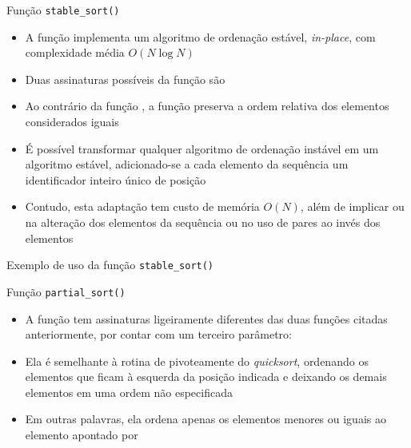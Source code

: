 \begin{frame}[fragile]{Função \texttt{stable\_sort()}}

    \begin{itemize}

        \item A função  implementa um algoritmo de ordenação estável,
            \textit{in-place}, com complexidade média $O(N\log N)$
        
        \item Duas assinaturas possíveis da função  são

        \item Ao contrário da função , a função 
            preserva a ordem relativa dos elementos considerados iguais

        \item É possível transformar qualquer algoritmo de ordenação instável em um algoritmo
            estável, adicionado-se a cada elemento da sequência um identificador inteiro 
            único de posição 

        \item Contudo, esta adaptação tem custo de memória $O(N)$, além de implicar ou na 
            alteração dos elementos da sequência ou no uso de pares ao invés dos elementos
    \end{itemize}

\end{frame}

\begin{frame}[fragile]{Exemplo de uso da função \texttt{stable\_sort()}}
\end{frame}

\begin{frame}[fragile]{Função \texttt{partial\_sort()}}

    \begin{itemize}

        \item A função  tem assinaturas ligeiramente diferentes
            das duas funções citadas anteriormente, por contar com um terceiro parâmetro:


        \item Ela é semelhante à rotina de pivoteamente do
            \textit{quicksort}, ordenando os elementos que ficam à esquerda da posição 
            indicada e deixando os demais elementos em uma ordem não especificada

        \item Em outras palavras, ela ordena apenas os elementos menores ou iguais ao
            elemento apontado por 

    \end{itemize}

\end{frame}

